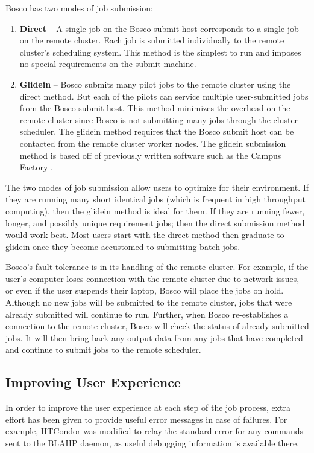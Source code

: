 Bosco has two modes of job submission:
\begin{enumerate}
	\item \textbf{Direct} -- A single job on the Bosco submit host corresponds to a single job on the remote cluster.  Each job is submitted individually to the remote cluster's scheduling system.  This method is the simplest to run and imposes no special requirements on the submit machine.
	\item \textbf{Glidein} -- Bosco submits many pilot jobs to the remote cluster using the direct method.  But each of the pilots can service multiple user-submitted jobs from the Bosco submit host.  This method minimizes the overhead on the remote cluster since Bosco is not submitting many jobs through the cluster scheduler.  The glidein method requires that the Bosco submit host can be contacted from the remote cluster worker nodes. \label{sec:glidein}  The glidein submission method is based off of previously written software such as the Campus Factory \cite{weitzel2011campus}.
\end{enumerate}

The two modes of job submission allow users to optimize for their environment.  If they are running many short identical jobs (which is frequent in high throughput computing), then the glidein method is ideal for them.  If they are running fewer, longer, and possibly unique requirement jobs; then the direct submission method would work best.  Most users start with the direct method then graduate to glidein once they become accustomed to submitting batch jobs.

Bosco's fault tolerance is in its handling of the remote cluster.  For example, if the user's computer loses connection with the remote cluster due to network issues, or even if the user suspends their laptop, Bosco will place the jobs on hold.  Although no new jobs will be submitted to the remote cluster, jobs that were already submitted will continue to run.  Further, when Bosco re-establishes a connection to the remote cluster, Bosco will check the status of already submitted jobs.  It will then bring back any output data from any jobs that have completed and continue to submit jobs to the remote scheduler.

\subsection{Improving User Experience}


In order to improve the user experience at each step of the job process, extra effort has been given to provide useful error messages in case of failures.  For example, HTCondor was modified to relay the standard error for any commands sent to the BLAHP daemon, as useful debugging information is available there.  

